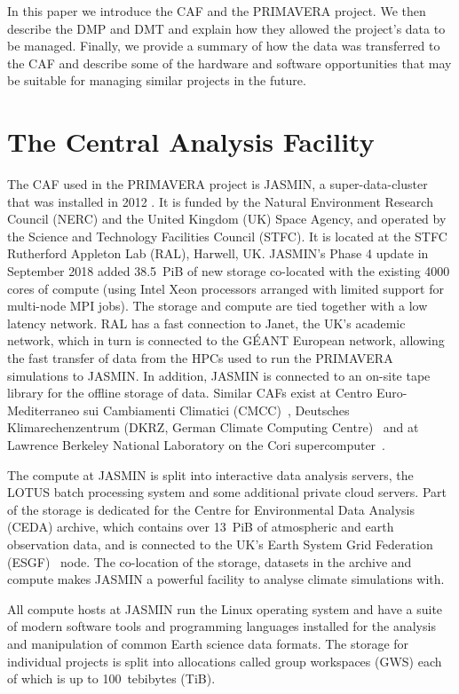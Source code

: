 \documentclass[gmd, manuscript]{copernicus}
\begin{document}
In this paper we introduce the CAF and the PRIMAVERA project. We then describe the DMP and DMT and explain how they allowed the project's data to be managed. Finally, we provide a summary of how the data was transferred to the CAF and describe some of the hardware and software opportunities that may be suitable for managing similar projects in the future.

\section{The Central Analysis Facility}

The CAF used in the PRIMAVERA project is JASMIN, a super-data-cluster that was installed in 2012 \citep{lawrence2013storing}. It is funded by the Natural Environment Research Council (NERC) and the United Kingdom (UK) Space Agency, and operated by the Science and Technology Facilities Council (STFC). It is located at the STFC Rutherford Appleton Lab (RAL), Harwell, UK. JASMIN's Phase 4 update in September 2018 added 38.5~PiB of new storage co-located with the existing 4000 cores of compute (using Intel Xeon processors arranged with limited support for multi-node MPI jobs). The storage and compute are tied together with a low latency network. RAL has a fast connection to Janet, the UK's academic network, which in turn is connected to the G\'{E}ANT European network, allowing the fast transfer of data from the HPCs used to run the PRIMAVERA simulations to JASMIN. In addition, JASMIN is connected to an on-site tape library for the offline storage of data. Similar CAFs exist at Centro Euro-Mediterraneo sui Cambiamenti Climatici (CMCC)~\citep{CMCC}, Deutsches Klimarechenzentrum (DKRZ, German Climate Computing Centre)~\citep{dkrz} and at Lawrence Berkeley National Laboratory on the Cori supercomputer~\citep{cori}.

The compute at JASMIN is split into interactive data analysis servers, the LOTUS batch processing system and some additional private cloud servers. Part of the storage is dedicated for the Centre for Environmental Data Analysis (CEDA) archive, which contains over 13~PiB of atmospheric and earth observation data, and is connected to the UK's Earth System Grid Federation (ESGF)~\citep{ESGFCinquini}\citep{gmd-14-629-2021} node. The co-location of the storage, datasets in the archive and compute makes JASMIN a powerful facility to analyse climate simulations with.

All compute hosts at JASMIN run the Linux operating system and have a suite of modern software tools and programming languages installed for the analysis and manipulation of common Earth science data formats. The storage for individual projects is split into allocations called group workspaces (GWS) each of which is up to 100~tebibytes (TiB).
\end{document}
